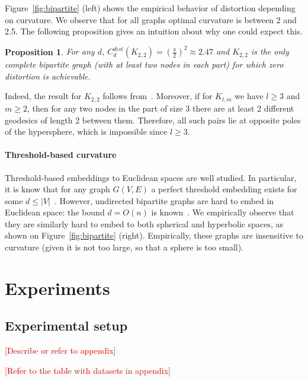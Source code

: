\documentclass{article} %
\newtheorem{proposition}[theorem]{Proposition}
\begin{document}
Figure~\ref{fig:bipartite} (left) shows the empirical behavior of distortion depending on curvature. We observe that for all graphs optimal curvature is between 2 and 2.5. 
The following proposition gives an intuition about why one could expect this. 

\begin{proposition}\label{prop:bipartite_distortion}
For any $d$, $C_d^{dist}(K_{2,2}) = \left(\frac{\pi}{2}\right)^2 \approx 2.47$ and $K_{2,2}$ is the only complete bipartite graph (with at least two nodes in each part) for which zero distortion is achievable.
\end{proposition}

Indeed, the result for $K_{2,2}$ follows from~. Moreover, if for $K_{l,m}$ we have $l \ge 3$ and $m \ge 2$, then for any two nodes in the part of size 3 there are at least 2 different geodesics of length 2 between them. Therefore, all such pairs lie at opposite poles of the hypersphere, which is impossible since $l \ge 3$.

\paragraph{Threshold-based curvature} 
 
Threshold-based embeddings to Euclidean spaces are well studied. In particular, it is know that for any graph $G(V,E)$ a perfect threshold embedding  exists for some $d \le |V|$~\citep{maehara1984space}. 
However, undirected bipartite graphs are hard to embed in Euclidean space: the bound $d = O(n)$ is known~\citep{maehara1984space}. We empirically observe that they are similarly hard to embed to both spherical and hyperbolic spaces, as shown on Figure~\ref{fig:bipartite} (right). Empirically, these graphs are insensitive to curvature (given it is not too large, so that a sphere is too small).
 
\section{Experiments}

\subsection{Experimental setup}

\textcolor{red}{[Describe or refer to appendix]}

\textcolor{red}{[Refer to the table with datasets in appendix]}
\end{document}
